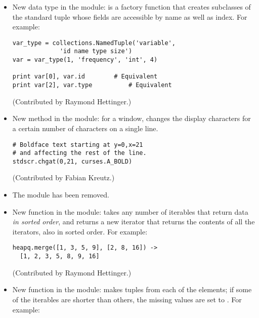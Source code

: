 \documentclass{howto}
\begin{document}
\begin{itemize}

\item New data type in the  module:
 is a factory function that
creates subclasses of the standard tuple whose fields are accessible
by name as well as index.  For example:

\begin{verbatim}
var_type = collections.NamedTuple('variable', 
             'id name type size')
var = var_type(1, 'frequency', 'int', 4)

print var[0], var.id		# Equivalent
print var[2], var.type          # Equivalent
\end{verbatim}

(Contributed by Raymond Hettinger.)

\item New method in the  module:
for a window,  changes the display characters for a 
certain number of characters on a single line.

\begin{verbatim}
# Boldface text starting at y=0,x=21 
# and affecting the rest of the line.
stdscr.chgat(0,21, curses.A_BOLD)  
\end{verbatim}

(Contributed by Fabian Kreutz.)

\item The  module has been removed.

\item New function in the  module:
takes any number of iterables that return data 
\emph{in sorted order}, 
and 
returns a new iterator that returns the contents of
all the iterators, also in sorted order.  For example:

\begin{verbatim}
heapq.merge([1, 3, 5, 9], [2, 8, 16]) ->
  [1, 2, 3, 5, 8, 9, 16]
\end{verbatim}

(Contributed by Raymond Hettinger.)

\item New function in the  module:
makes tuples from each of the elements; if some of the iterables
are shorter than others, the missing values 
are set to .  For example:


\end{itemize}
\end{document}
